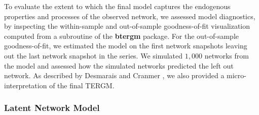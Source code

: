 To evaluate the extent to which the final model captures the endogenous properties and processes of the observed network, we assessed model diagnostics, by inspecting the within-sample and out-of-sample goodness-of-fit visualization computed from a subroutine of the \textbf{btergm} package. For the out-of-sample goodness-of-fit, we estimated the model on the first network snapshots leaving out the last network snapshot in the series. We simulated $1,000$ networks from the model and assessed how the simulated networks predicted the left out network. As described by Desmarais and Cranmer \cite{desmarais_micro-level_2012}, we also provided a micro-interpretation of the final TERGM.

\subsubsection{Latent Network Model}
\label{sec:methods_lnm}
